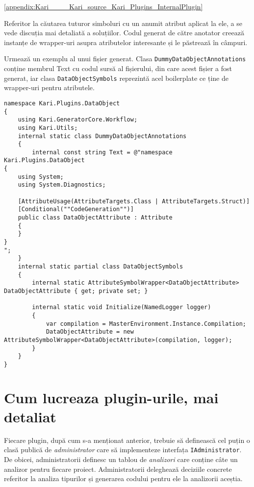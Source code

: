 \documentclass[a4paper,12pt]{report}
\begin{document}
\ref{appendix:Kari____Kari_source_Kari_Plugins_InternalPlugin}



Referitor la căutarea tuturor simboluri cu un anumit atribut aplicat la ele, a se vede discuția mai detaliată a soluțiilor.
Codul generat de către anotator creează instanțe de wrapper-uri asupra atributelor interesante și le păstrează în câmpuri.\cite{converting_attributes_roslyn}


Urmează un exemplu al unui fișier generat.
Clasa \texttt{DummyDataObjectAnnotations} conține membrul Text cu codul sursă al fișierului, din care acest fișier a fost generat,
iar clasa \texttt{DataObjectSymbols} reprezintă acel boilerplate ce ține de wrapper-uri pentru atributele.

\begin{lstlisting}
namespace Kari.Plugins.DataObject
{
    using Kari.GeneratorCore.Workflow;
    using Kari.Utils;
    internal static class DummyDataObjectAnnotations
    {
        internal const string Text = @"namespace Kari.Plugins.DataObject
{
    using System;
    using System.Diagnostics;

    [AttributeUsage(AttributeTargets.Class | AttributeTargets.Struct)]
    [Conditional(""CodeGeneration"")]
    public class DataObjectAttribute : Attribute
    {
    }
}
";
    }
    internal static partial class DataObjectSymbols
    {
        internal static AttributeSymbolWrapper<DataObjectAttribute> DataObjectAttribute { get; private set; }

        internal static void Initialize(NamedLogger logger)
        {
            var compilation = MasterEnvironment.Instance.Compilation;
            DataObjectAttribute = new AttributeSymbolWrapper<DataObjectAttribute>(compilation, logger);
        }
    }
}
\end{lstlisting}

\section{Cum lucreaza plugin-urile, mai detaliat}

Fiecare plugin, după cum s-a menționat anterior, trebuie să definească cel puțin o clasă publică de \emph{administrator} care să implementeze interfața \texttt{IAdministrator}.
De obicei, administratorii definesc un tablou de \emph{analizori} care conține câte un analizor pentru fiecare proiect.
Administratorii deleghează deciziile concrete referitor la analiza tipurilor și generarea codului pentru ele la analizorii aceștia.
\end{document}
